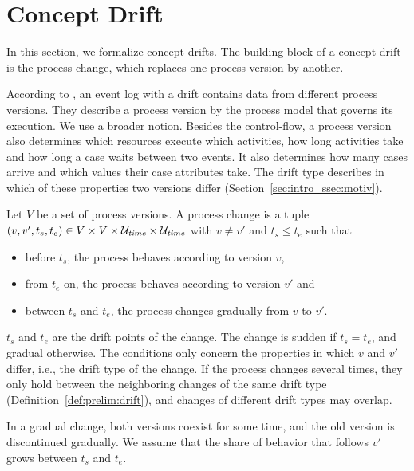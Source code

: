\section{Concept Drift}
\label{sec:prelim:drift}
In this section, we formalize concept drifts. The building block of a concept drift is the process change, which replaces one process version by another. 

According to \textcite{kraus2026characterization}, an event log with a drift contains data from different process versions. They describe a process version by the process model that governs its execution. We use a broader notion. Besides the control-flow, a process version also determines which resources execute which activities, how long activities take and how long a case waits between two events. It also determines how many cases arrive and which values their case attributes take. The drift type describes in which of these properties two versions differ (Section~\ref{sec:intro_ssec:motiv}).

\begin{definition}
	\label{def:prelim:change}
	Let $V$ be a set of process versions. A process change is a tuple $(v, v', t_s, t_e) \in V \times V \times \mathcal{U}_{\mathit{time}} \times \mathcal{U}_{\mathit{time}}$ with $v \neq v'$ and $t_s \le t_e$ such that
	\begin{itemize}
		\item before $t_s$, the process behaves according to version $v$,
		\item from $t_e$ on, the process behaves according to version $v'$ and
		\item between $t_s$ and $t_e$, the process changes gradually from $v$ to $v'$.
	\end{itemize}
	$t_s$ and $t_e$ are the drift points of the change. The change is sudden if $t_s = t_e$, and gradual otherwise. The conditions only concern the properties in which $v$ and $v'$ differ, i.e., the drift type of the change. If the process changes several times, they only hold between the neighboring changes of the same drift type (Definition~\ref{def:prelim:drift}), and changes of different drift types may overlap.
\end{definition}

In a gradual change, both versions coexist for some time, and the old version is discontinued gradually. We assume that the share of behavior that follows $v'$ grows between $t_s$ and $t_e$.

